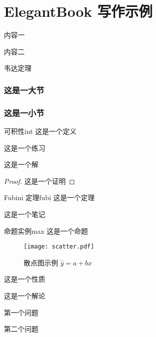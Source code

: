\chapter{ElegantBook 写作示例}

\begin{introduction}
  \item 内容一
  \item 内容二
  \item 韦达定理
\end{introduction}

\subsection{这是一大节}

\subsection{这是一小节}

\begin{definition}{可积性}{int} 
这是一个定义
\end{definition}



\begin{exercise}
这是一个练习
\end{exercise}

\begin{solution}
这是一个解
\end{solution}

\begin{proof}
这是一个证明
\end{proof}

\begin{theorem}{Fubini 定理}{fubi} 
这是一个定理
\end{theorem}

\begin{note}
这是一个笔记
\end{note}


\begin{proposition}{命题实例}{max}
这是一个命题
\end{proposition}


\begin{figure}[htbp]
  \centering
  \texttt{[image: scatter.pdf]}
  \caption{散点图示例 $\hat{y}=a+bx$ \label{fig:scatter}}
\end{figure}

\begin{property}
这是一个性质
\end{property}

\begin{conclusion}
这是一个解论
\end{conclusion}

\begin{problemset}
\item 第一个问题
\item 第二个问题
\end{problemset}